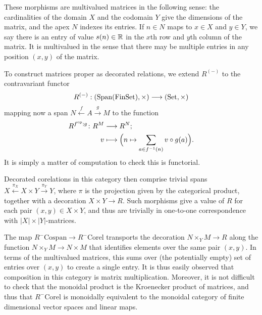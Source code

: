 These morphisms are multivalued matrices in the following sense: the
cardinalities of the domain $X$ and the codomain $Y$ give the dimensions of the
matrix, and the apex $N$ indexes its entries. If $n \in N$ maps to $x \in X$ and
$y \in Y$, we say there is an entry of value $s(n) \in {\mathbb{R}}$ in the $x$th row and
$y$th column of the matrix. It is multivalued in the sense that there may be
multiple entries in any position $(x,y)$ of the matrix.


To construct matrices proper as decorated relations, we extend $R^{(-)}$ to the
contravariant functor
\[
  R^{(-)}: (\mathrm{Span(FinSet)},\times) \longrightarrow (\mathrm{Set},\times)
\]
mapping now a span $N \stackrel{f}\leftarrow A \stackrel{g}\to M$ to the
function
\begin{align*}
  R^{f^{\mathrm{op}};g}{\colon} R^M &\longrightarrow R^N; \\
  v &\longmapsto \Big(n \mapsto \sum_{a \in f^{-1}(n)} v\circ g(a)\Big).
\end{align*}
It is simply a matter of computation to check this is functorial.

Decorated corelations in this category then comprise trivial spans $X
\xleftarrow{\pi_X} X \times Y \xrightarrow{\pi_Y} Y$, where $\pi$ is the
projection given by the categorical product, together with a decoration $X\times
Y \to R$. Such morphisms give a value of $R$ for each pair $(x,y) \in X \times
Y$, and thus are trivially in one-to-one correspondence with $\lvert X \rvert
\times \lvert Y\rvert$-matrices. 

The map $R^{-}\mathrm{Cospan} \to R^{-}\mathrm{Corel}$ transports the decoration
$N\times_YM \to R$ along the function $N \times_YM \to N \times M$ that
identifies elements over the same pair $(x,y)$. In terms of the multivalued
matrices, this sums over (the potentially empty) set of entries over $(x,y)$ to
create a single entry. It is thus easily observed that composition in this
category is matrix multiplication. Moreover, it is not difficult to check that
the monoidal product is the Kroenecker product of matrices, and thus that
$R^{-}\mathrm{Corel}$ is monoidally equivalent to the monoidal category of
finite dimensional vector spaces and linear maps.


